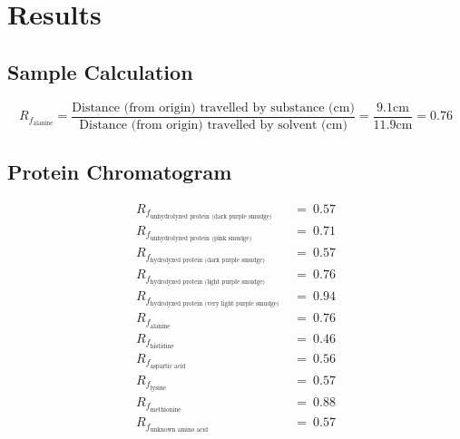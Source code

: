 \section*{Results}
    \subsection*{Sample Calculation}
    \[
        R_{f_{\text{alanine}}}
        = \frac{\text{Distance (from origin) travelled by substance (cm)}}{\text{Distance (from origin) travelled by solvent (cm)}}
        = \frac{9.1 \text{cm}}{11.9 \text{cm}}
        = 0.76
    \]
    \subsection*{Protein Chromatogram}
    \begin{align*}
        R_{f_{\text{unhydrolyzed protein (dark purple smudge)}}}\
        &=\ 0.57\\
        R_{f_{\text{unhydrolyzed protein (pink smudge)}}}\
        &=\ 0.71\\
        R_{f_{\text{hydrolyzed protein (dark purple smudge)}}}\
        &=\ 0.57\\
        R_{f_{\text{hydrolyzed protein (light purple smudge)}}}\
        &=\ 0.76\\
        R_{f_{\text{hydrolyzed protein (very light purple smudge)}}}\
        &=\ 0.94\\
        R_{f_{\text{alanine}}}\
        &=\ 0.76\\
        R_{f_{\text{histidine}}}\
        &=\ 0.46\\
        R_{f_{\text{aspartic acid}}}\
        &=\ 0.56\\
        R_{f_{\text{lysine}}}\
        &=\ 0.57\\
        R_{f_{\text{methionine}}}\
        &=\ 0.88\\
        R_{f_{\text{unknown amino acid}}}\
        &=\ 0.57
    \end{align*}
